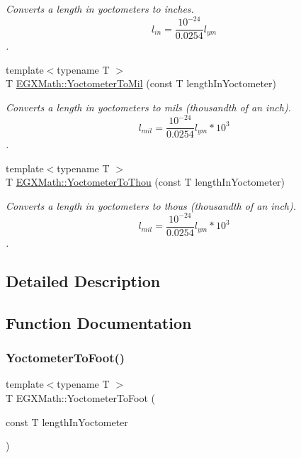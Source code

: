 \begin{DoxyCompactItemize}
\begin{DoxyCompactList}\small\item\em Converts a length in yoctometers to inches. \[ l_{in}= \frac{10^{-24}}{0.0254} l_{ym} \]. \end{DoxyCompactList}\item 
{\footnotesize template$<$typename T $>$ }\\T \mbox{\hyperlink{group___e_g_x_math-_conversions-_length_conversions-_s_i-_yoctometer-_imperial_gacb2a1154ec79cfd130de96e92dfeedfa}{E\+G\+X\+Math\+::\+Yoctometer\+To\+Mil}} (const T length\+In\+Yoctometer)
\begin{DoxyCompactList}\small\item\em Converts a length in yoctometers to mils (thousandth of an inch). \[ l_{mil}= \frac{10^{-24}}{0.0254} l_{ym} * 10^{3} \]. \end{DoxyCompactList}\item 
{\footnotesize template$<$typename T $>$ }\\T \mbox{\hyperlink{group___e_g_x_math-_conversions-_length_conversions-_s_i-_yoctometer-_imperial_ga9c2fbce1711afe0740edd868815ffea1}{E\+G\+X\+Math\+::\+Yoctometer\+To\+Thou}} (const T length\+In\+Yoctometer)
\begin{DoxyCompactList}\small\item\em Converts a length in yoctometers to thous (thousandth of an inch). \[ l_{mil}= \frac{10^{-24}}{0.0254} l_{ym} * 10^{3} \]. \end{DoxyCompactList}\end{DoxyCompactItemize}


\subsection{Detailed Description}


\subsection{Function Documentation}
\mbox{\label{group___e_g_x_math-_conversions-_length_conversions-_s_i-_yoctometer-_imperial_gad8cb5223284af20fc0d29fefa17ec091}} 
\subsubsection{\texorpdfstring{Yoctometer\+To\+Foot()}{YoctometerToFoot()}}
{\footnotesize\ttfamily template$<$typename T $>$ \\
T E\+G\+X\+Math\+::\+Yoctometer\+To\+Foot (\begin{DoxyParamCaption}\item[{const T}]{length\+In\+Yoctometer }\end{DoxyParamCaption})}



